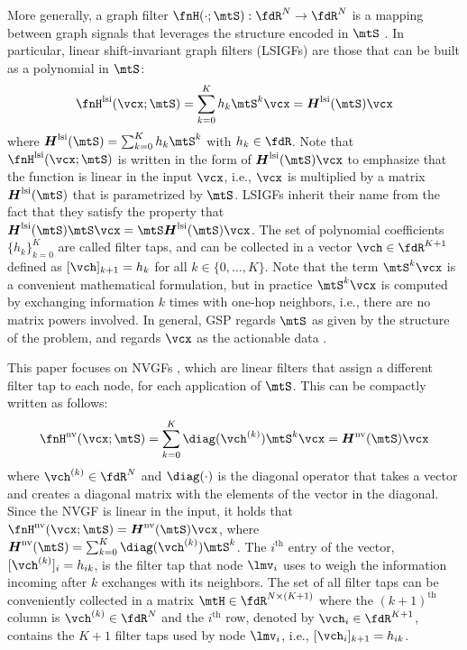 More generally, a graph filter $\fnH(\cdot;\mtS): \fdR^{N} \to \fdR^{N}$ is a mapping between graph signals that leverages the structure encoded in $\mtS$ \cite{Segarra2017-GraphFilterDesign}. In particular, linear shift-invariant graph filters (LSIGFs) are those that can be built as a polynomial in $\mtS$:
\begin{equation} \label{eq:LSIfilter}
    \fnH^{\text{lsi}}(\vcx;\mtS) = \sum_{k=0}^{K} h_{k} \mtS^{k} \vcx = \mtfnH^{\text{lsi}}(\mtS) \vcx
\end{equation}
%
where $\mtfnH^{\text{lsi}}(\mtS) = \sum_{k=0}^{K} h_{k} \mtS^{k}$ with $h_{k} \in \fdR$. Note that $\fnH^{\text{lsi}}(\vcx;\mtS)$ is written in the form of $\mtfnH^{\text{lsi}}(\mtS)\vcx$ to emphasize that the function is linear in the input $\vcx$, i.e., $\vcx$ is multiplied by a matrix $\mtfnH^{\text{lsi}}(\mtS)$ that is parametrized by $\mtS$. LSIGFs inherit their name from the fact that they satisfy the property that $\mtfnH^{\text{lsi}}(\mtS)\mtS \vcx = \mtS \mtfnH^{\text{lsi}}(\mtS) \vcx$. The set of polynomial coefficients $\{h_{k}\}_{k=0}^{K}$ are called filter taps, and can be collected in a vector $\vch \in \fdR^{K+1}$ defined as $[\vch]_{k+1} = h_{k}$ for all $k \in \{0,\ldots,K\}$. Note that the term $\mtS^{k}\vcx$ is a convenient mathematical formulation, but in practice $\mtS^{k}\vcx$ is computed by exchanging information $k$ times with one-hop neighbors, i.e., there are no matrix powers involved. In general, GSP regards $\mtS$ as given by the structure of the problem, and regards $\vcx$ as the actionable data \cite{Sandryhaila2013-DSPG, Shuman2013-SPG, Ortega2018-GSP}.

This paper focuses on NVGFs \cite{Segarra2017-GraphFilterDesign}, which are linear filters that assign a different filter tap to each node, for each application of $\mtS$. This can be compactly written as follows:
\begin{equation} \label{eq:NVGF}
    \fnH^{\text{nv}}(\vcx;\mtS) = \sum_{k=0}^{K} \diag(\vch^{(k)}) \mtS^{k} \vcx = \mtfnH^{\text{nv}}(\mtS) \vcx
\end{equation}
%
where $\vch^{(k)} \in \fdR^{N}$ and $\diag(\cdot)$ is the diagonal operator that takes a vector and creates a diagonal matrix with the elements of the vector in the diagonal. Since the NVGF is linear in the input, it holds that $\fnH^{\text{nv}}(\vcx;\mtS) = \mtfnH^{\text{nv}}(\mtS) \vcx$, where $\mtfnH^{\text{nv}}(\mtS) = \sum_{k=0}^{K} \diag(\vch^{(k)}) \mtS^{k}$. The $i^{\text{th}}$ entry of the vector, $[\vch^{(k)}]_{i} = h_{ik}$, is the filter tap that node $\lmv_{i}$ uses to weigh the information incoming after $k$ exchanges with its neighbors. The set of all filter taps can be conveniently collected in a matrix $\mtH \in \fdR^{N \times (K+1)}$ where the $(k+1)^{\text{th}}$ column is $\vch^{(k)} \in \fdR^{N}$ and the $i^{\text{th}}$ row, denoted by $\vch_{i} \in \fdR^{K+1}$, contains the $K+1$ filter taps used by node $\lmv_{i}$, i.e., $[\vch_{i}]_{k+1} = h_{ik}$. %

